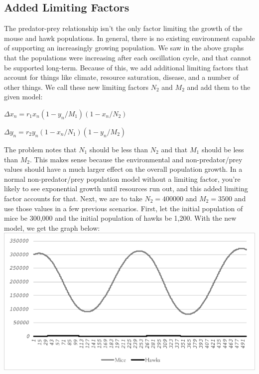 \documentclass[10pt,letterpaper]{article}
\begin{document}
		\subsection{Added Limiting Factors}
			The predator-prey relationship isn't the only factor limiting the growth of the mouse and hawk populations. In general, there is no existing environment capable of supporting an increasingly growing population. We saw in the above graphs that the populations were increasing after each oscillation cycle, and that cannot be supported long-term. Because of this, we add additional limiting factors that account for things like climate, resource saturation, disease, and a number of other things. We call these new limiting factors $N_{2}$ and $M_{2}$ and add them to the given model:
			\newline \newline
			\centerline{$\Delta x_{n} = r_{1} x_{n} (1 - y_{n} / M_{1}) (1 - x_{n} / N_{2})$}
			\newline
			\centerline{$\Delta y_{n} = r_{2} y_{n} (1 - x_{n} / N_{1}) (1 - y_{n} / M_{2})$}
			\newline \newline
			The problem notes that $N_{1}$ should be less than $N_{2}$ and that $M_{1}$ should be less than $M_{2}$. This makes sense because the environmental and non-predator/prey values should have a much larger effect on the overall population growth. In a normal non-predator/prey population model without a limiting factor, you're likely to see exponential growth until resources run out, and this added limiting factor accounts for that. 
			\newline \newline
			Next, we are to take $N_{2} = 400000$ and $M_{2} = 3500$ and use those values in a few previous scenarios. First, let the initial population of mice be 300,000 and the initial population of hawks be 1,200. With the new model, we get the graph below:
			\newline \newline \newline
			\includegraphics[width=\textwidth]{graph4.pdf}
\end{document}
